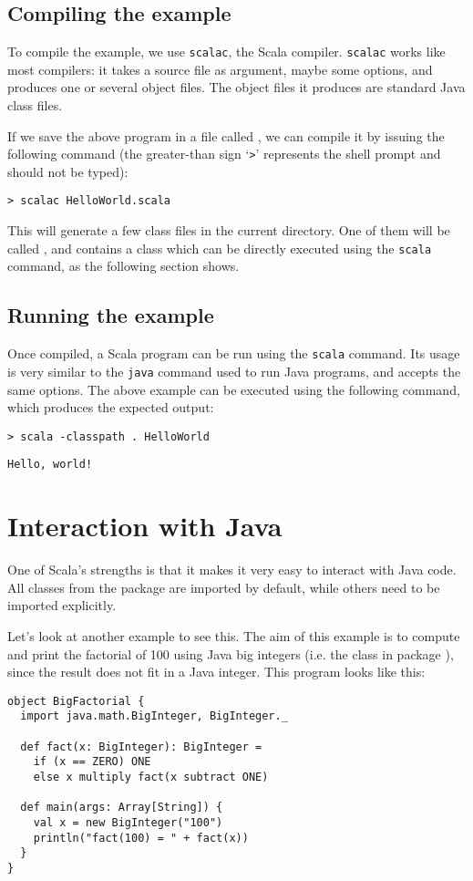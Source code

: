 \documentclass[a4paper,12pt,twoside,titlepage]{article}
\newcommand{\langname}[1]{#1\xspace}
\newcommand{\Scala}{\langname{Scala}}
\newcommand{\Java}{\langname{Java}}
\newcommand{\toolname}[1]{\texttt{#1}\xspace}
\newcommand{\scalac}{\toolname{scalac}}
\newcommand{\scala}{\toolname{scala}}
\newcommand{\java}{\toolname{java}}
\begin{document}
\subsection{Compiling the example}
\label{sec:compiling-example}

To compile the example, we use \scalac, the \Scala compiler. \scalac
works like most compilers: it takes a source file as argument, maybe
some options, and produces one or several object files. The object
files it produces are standard \Java class files.

If we save the above program in a file called
, we can compile it by issuing the following
command (the greater-than sign `\verb|>|' represents the shell prompt
and should not be typed):
\begin{verbatim}
> scalac HelloWorld.scala
\end{verbatim}
This will generate a few class files in the current directory. One of
them will be called , and contains a class
which can be directly executed using the \scala command, as the
following section shows.

\subsection{Running the example}
\label{sec:running-example}

Once compiled, a \Scala program can be run using the \scala command.
Its usage is very similar to the \java command used to run \Java
programs, and accepts the same options. The above example can be
executed using the following command, which produces the expected
output:
\begin{verbatim}
> scala -classpath . HelloWorld
\end{verbatim}
\begin{verbatim}
Hello, world!
\end{verbatim}

\section{Interaction with Java}
\label{sec:inter-with-java}

One of \Scala's strengths is that it makes it very easy to interact
with \Java code. All classes from the  package are
imported by default, while others need to be imported explicitly.

Let's look at another example to see this. The aim of this example is
to compute and print the factorial of 100 using \Java big integers
(i.e. the class  in package ),
since the result does not fit in a \Java integer. This program looks
like this:
\begin{lstlisting}
object BigFactorial {
  import java.math.BigInteger, BigInteger._

  def fact(x: BigInteger): BigInteger =
    if (x == ZERO) ONE
    else x multiply fact(x subtract ONE)

  def main(args: Array[String]) {
    val x = new BigInteger("100")
    println("fact(100) = " + fact(x))
  }
}
\end{lstlisting}
\end{document}
